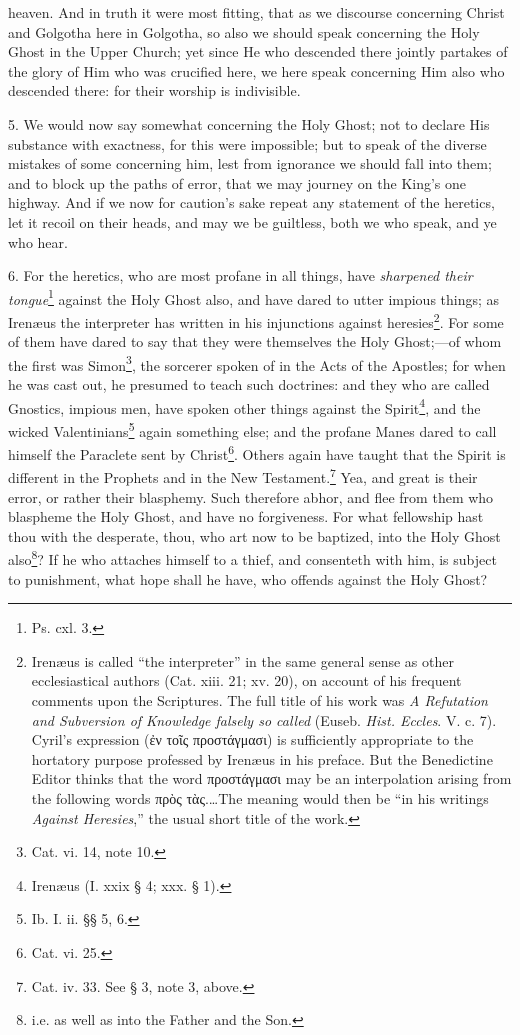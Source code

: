heaven. And in truth it were most fitting, that as we discourse concerning Christ and Golgotha here in Golgotha, so also we should speak concerning the Holy Ghost in the Upper Church; yet since He who descended there jointly partakes of the glory of Him who was crucified here, we here speak concerning Him also who descended there: for their worship is indivisible.

5. We would now say somewhat concerning the Holy Ghost; not to declare His substance with exactness, for this were impossible; but to speak of the diverse mistakes of some concerning him, lest from ignorance we should fall into them; and to block up the paths of error, that we may journey on the King’s one highway. And if we now for caution’s sake repeat any statement of the heretics, let it recoil on their heads, and may we be guiltless, both we who speak, and ye who hear.

6. For the heretics, who are most profane in all things, have \emph{sharpened their tongue}\footnote{Ps. cxl. 3.} against the Holy Ghost also, and have dared to utter impious things; as Irenæus the interpreter has written in his injunctions against heresies\footnote{Irenæus is called “the interpreter” in the same general sense as other ecclesiastical authors (Cat. xiii. 21; xv. 20), on account of his frequent comments upon the Scriptures. The full title of his work was \emph{A Refutation and Subversion of Knowledge falsely so called} (Euseb. \emph{Hist. Eccles}. V. c. 7). Cyril’s expression (\textgreek{ἐν τοῖς προστάγμασι}) is sufficiently appropriate to the hortatory purpose professed by Irenæus in his preface. But the Benedictine Editor thinks that the word \textgreek{προστάγμασι} may be an interpolation arising from the following words \textgreek{πρὸς τὰς}.…The meaning would then be “in his writings \emph{Against Heresies},” the usual short title of the work.}. For some of them have dared to say that they were themselves the Holy Ghost;—of whom the first was Simon\footnote{Cat. vi. 14, note 10.}, the sorcerer spoken of in the Acts of the Apostles; for when he was cast out, he presumed to teach such doctrines: and they who are called Gnostics, impious men, have spoken other things against the Spirit\footnote{Irenæus (I. xxix § 4; xxx. § 1).}, and the wicked Valentinians\footnote{Ib. I. ii. §§ 5, 6.} again something else; and the profane Manes dared to call himself the Paraclete sent by Christ\footnote{Cat. vi. 25.}. Others again have taught that the Spirit is different in the Prophets and in the New Testament.\footnote{Cat. iv. 33. See § 3, note 3, above.} Yea, and great is their error, or rather their blasphemy. Such therefore abhor, and flee from them who blaspheme the Holy Ghost, and have no forgiveness. For what fellowship hast thou with the desperate, thou, who art now to be baptized, into the Holy Ghost also\footnote{i.e. as well as into the Father and the Son.}? If he who attaches himself to a thief, and consenteth with him, is subject to punishment, what hope shall he have, who offends against the Holy Ghost?

